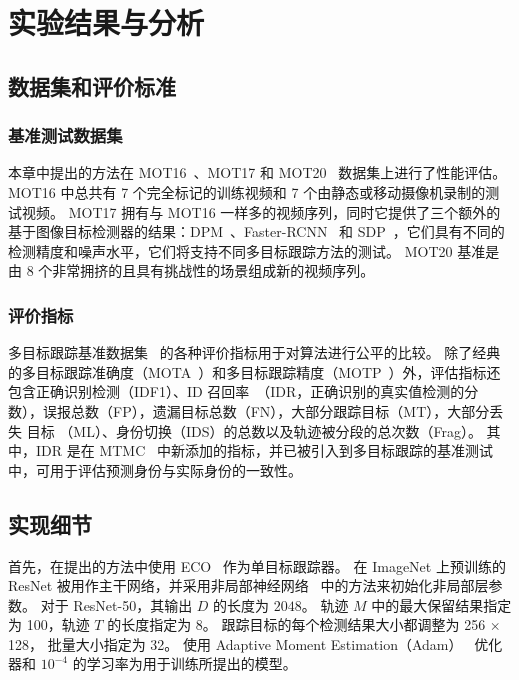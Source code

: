 \section{实验结果与分析}

\subsection{数据集和评价标准}

\subsubsection{基准测试数据集}
本章中提出的方法在 MOT16~\cite{RN583}、MOT17 和 MOT20~\cite{dendorfer2020mot20} 数据集上进行了性能评估。
MOT16 中总共有 7 个完全标记的训练视频和 7 个由静态或移动摄像机录制的测试视频。
MOT17 拥有与 MOT16 一样多的视频序列，同时它提供了三个额外的基于图像目标检测器的结果：DPM~\cite{dpm}、Faster-RCNN~\cite{ren2017faster} 和 SDP~\cite{yang2016exploit}，它们具有不同的检测精度和噪声水平，它们将支持不同多目标跟踪方法的测试。
MOT20 基准是由 8 个非常拥挤的且具有挑战性的场景组成新的视频序列。

\subsubsection{评价指标}
多目标跟踪基准数据集~\cite{RN583} 的各种评价指标用于对算法进行公平的比较。
除了经典的多目标跟踪准确度（MOTA~\cite{RN475}）和多目标跟踪精度（MOTP~\cite{RN550}）外，评估指标还包含正确识别检测（IDF1）、ID 召回率~\cite{ristani2016performance}（IDR，正确识别的真实值检测的分数），误报总数（FP），遗漏目标总数（FN），大部分跟踪目标（MT），大部分丢失 目标 （ML）、身份切换（IDS）的总数以及轨迹被分段的总次数（Frag）。
其中，IDR 是在 MTMC~\cite{ristani2016performance} 中新添加的指标，并已被引入到多目标跟踪的基准测试中，可用于评估预测身份与实际身份的一致性。


\subsection{实现细节}
首先，在提出的方法中使用 ECO~\cite{danelljan2017eco} 作为单目标跟踪器。
在 ImageNet\cite{RN991} 上预训练的 ResNet 被用作主干网络，并采用非局部神经网络~\cite{RN580} 中的方法来初始化非局部层参数。
对于 ResNet-50，其输出 $D$ 的长度为 $2048$。
轨迹 $M$ 中的最大保留结果指定为 100，轨迹 $T$ 的长度指定为 8。
跟踪目标的每个检测结果大小都调整为 256 $\times $ 128，
批量大小指定为 32。
使用 Adaptive Moment Estimation（Adam）~\cite{RN586} 优化器和 $10^{-4}$ 的学习率为用于训练所提出的模型。

